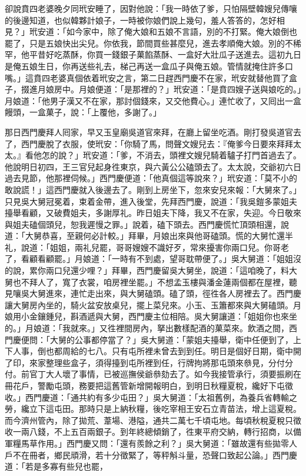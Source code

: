 卻說賁四老婆晚夕同玳安睡了，因對他說：「我一時依了爹，只怕隔壁韓嫂兒傳嚷的後邊知道，也似韓夥計娘子，一時被你娘們說上幾句，羞人答答的，怎好相見？」玳安道：「如今家中，除了俺大娘和五娘不言語，別的不打緊。俺大娘倒也罷了，只是五娘快出尖兒。你依我，節間買些甚麼兒，進去孝順俺大娘。別的不稀罕，他平昔好吃蒸酥，你買一錢銀子菓餡蒸酥、一盒好大壯瓜子送進去。這初九日是俺五娘生日，你再送些礼去，梯己再送一盒瓜子與俺五娘。管情就掩住許多口嘴。」{}這賁四老婆真個依着玳安之言，第二日趕西門慶不在家，玳安就替他買了盒子，掇進月娘房中。月娘便道：「是那裡的？」玳安道：「是賁四嫂子送與娘吃的。」月娘道：「他男子漢又不在家，那討個錢來，又交他費心。」連忙收了，又囘出一盒饅頭，一盒菓子，說：「上覆他，多謝了。」

那日西門慶拜人囘家，早又玉皇廟吳道官來拜，在廳上留坐吃酒。剛打發吳道官去了，西門慶脫了衣服，使玳安：「你騎了馬，問聲文嫂兒去：『俺爹今日要來拜拜太太。』看他怎的說？」玳安道：「爹，不消去，頭裡文嫂兒騎着驢子打門首過去了。他說明日初四，王三官兒起身徃東京，與六黃公公磕頭去了。太太說，交爺初六日過去見節，他那裡伺候。」西門慶便道：「他真個這等說來？」玳安道：「莫不小的敢說謊！」這西門慶就入後邊去了。剛到上房坐下，忽來安兒來報：「大舅來了。」只見吳大舅冠冕着，束着金帶，進入後堂，先拜西門慶，說道：「我吳鎧多蒙姐夫擡舉看顧，又破費姐夫，多謝厚礼。昨日姐夫下降，我又不在家，失迎。今日敬來與姐夫磕個頭兒，恕我遲慢之罪。」說着，磕下頭去。西門慶慌忙頂頭相還，說道：「大舅恭喜，至親何必計較。」拜畢，月娘出來與他哥磕頭。慌的大舅忙還半礼，說道：「姐姐，兩礼兒罷，哥哥嫂嫂不識好歹，常來擾害你兩口兒。你哥老了，看顧看顧罷。」月娘道：「一時有不到處，望哥耽帶便了。」吳大舅道：「姐姐沒的說，累你兩口兒還少哩？」拜畢，西門慶留吳大舅坐，說道：「這咱晚了，料大舅也不拜人了，寬了衣裳，咱房裡坐罷。」不想孟玉樓與潘金蓮兩個都在屋裡，聽見嚷吳大舅進來，連忙走出來，與大舅磕頭。磕了頭，徑徃各人房裡去了。西門慶讓大舅房內坐的，騎火盆安放桌兒，擺上菜兒來。小玉、玉簫都來與大舅磕頭。月娘用小金鑲鍾兒，斟酒遞與大舅，西門慶主位相陪。吳大舅讓道：「姐姐你也來坐的。」月娘道：「我就來。」又徃裡間房內，拏出數樣配酒的菓菜來。飲酒之間，西門慶便問：「大舅的公事都停當了？」吳大舅道：「蒙姐夫擡舉，衛中任便到了，上下人事，倒也都周給的七八。只有屯所裡未曾去到到任。明日是個好日期，衛中開了印，來家整理些盒子，須得擡到屯所裡到任，行牌拘將那屯頭來叅見，分付分付。前官丁大人壞了事情，已被巡撫侯爺叅劾去了。如今我接管承行，須要振刷在冊花戶，警勵屯頭，務要把這舊管新增開報明白，到明日秋糧夏稅，纔好下屯徵收。」西門慶道：「通共約有多少屯田？」吳大舅道：「太祖舊例，為養兵省轉輸之勞，纔立下這屯田。那時只是上納秋糧，後吃宰相王安石立青苗法，增上這夏稅。而今濟州管內，除了拋荒、葦場、港隘，通共二萬七千頃屯地。每頃秋稅夏稅只徵收一兩八錢，不上五百兩銀子。到年終總傾銷了，徃東平府交納，轉行招商，以備軍糧馬草作用。」西門慶又問：「還有羨餘之利？」吳大舅道：「雖故還有些拋零人戶不在冊者，鄉民頑滑，若十分徵緊了，等秤斛斗量，恐聲口致起公論。」西門慶道：「若是多寡有些兒也罷，